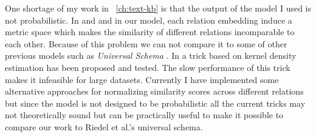   One shortage of my work in  ~\autoref{ch:text-kb} is that the output of
  the model I used is not probabilistic. In \cite{Bordes2011} and
  \cite{Bordes2012} and in our model, each relation embedding induce a metric
  space which makes the similarity of different relations incomparable to each
  other. Because of this problem we can not compare it to some of other previous
  models such as \textit{Universal Schema} \cite{Riedel2013}. In
  \cite{Bordes2011} a trick based on kernel density estimation has been proposed and tested. 
  The slow performance of this trick makes it infeasible for large datasets.
  Currently I have implemented some alternative approaches for normalizing
  similarity scores across different relations but since the model is not
  designed to be probabilistic all the current tricks may not theoretically
  sound but can be practically useful to make it possible to compare our work to
  Riedel et al.'s universal schema.
  
  
